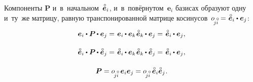 \begin{otherlanguage}{russian}
Компоненты ${\bm{P}}$ и~в~начальном~${\mathcircabove{\bm{e}}_i}$, и~в~повёрнутом~${\bm{e}_i}$ базисах образуют одну и~ту~же матрицу, равную транспонированной матрице косинусов~${\cosinematrix{\!j\mathcircabove{i}} = \hspace{.12ex} \mathcircabove{\bm{e}}_i \dotp \bm{e}_j}$\hspace{0.1ex}:
\begin{equation}\label{componentsofrotationtensor}
\begin{array}{c}
\bm{e}_i \dotp \bm{P} \hspace{-0.12ex} \dotp \bm{e}_j =
\hspace{0.2ex} \tikzmark{beginEqualsKroneckerDeltaPresent} \bm{e}_i \hspace{-0.1ex} \dotp \bm{e}_k \tikzmark{endEqualsKroneckerDeltaPresent} \hspace{0.2ex} \mathcircabove{\bm{e}}_k \hspace{-0.12ex} \dotp \bm{e}_j =
\hspace{0.2ex} \mathcircabove{\bm{e}}_i \hspace{-0.12ex} \dotp \bm{e}_j , \\[1.4em]
%
\mathcircabove{\bm{e}}_i \dotp \bm{P} \hspace{-0.12ex} \dotp \mathcircabove{\bm{e}}_j =
\hspace{0.2ex} \mathcircabove{\bm{e}}_i \hspace{-0.1ex} \dotp \bm{e}_k \hspace{0.2ex} \tikzmark{beginEqualsKroneckerDeltaPast} \mathcircabove{\bm{e}}_k \hspace{-0.12ex} \dotp \mathcircabove{\bm{e}}_j \tikzmark{endEqualsKroneckerDeltaPast} =
\hspace{0.2ex} \mathcircabove{\bm{e}}_i \hspace{-0.12ex} \dotp \bm{e}_j , \\[1.5em]
%
\bm{P} = \cosinematrix{\!j\mathcircabove{i}} \hspace{0.5ex} {\bm{e}}_i {\bm{e}}_j = \cosinematrix{\!j\mathcircabove{i}} \hspace{0.5ex} \mathcircabove{\bm{e}}_i \mathcircabove{\bm{e}}_j \hspace{0.1ex}.
\end{array}
\end{equation}


\end{otherlanguage}
